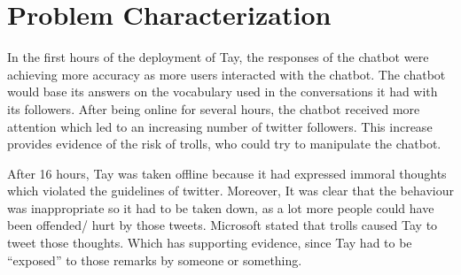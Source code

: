 \chapter{Problem Characterization}
In the first hours of the deployment of Tay, the responses of the chatbot were achieving more accuracy as more users interacted with the chatbot. The chatbot would base its answers on the vocabulary used in the conversations it had with its followers. After being online for several hours, the chatbot received more attention which led to an increasing number of twitter followers. This increase provides evidence of the risk of trolls, who could try to manipulate the chatbot.

After 16 hours, Tay was taken offline because it had expressed immoral thoughts which violated the guidelines of twitter. Moreover, It was clear that the behaviour was inappropriate so it had to be taken down, as a lot more people could have been offended/ hurt by those tweets. Microsoft stated that trolls caused Tay to tweet those thoughts. Which has supporting evidence, since Tay had to be “exposed” to those remarks by someone or something.

